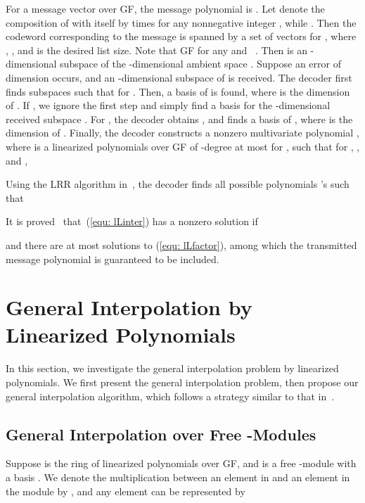 \documentclass[11pt,onecolumn,draftcls]{IEEEtran}
\begin{document}
For a message vector  over GF, the message polynomial is . Let  denote the composition of  with itself by  times for any nonnegative integer , while . Then the codeword  corresponding to the message  is spanned by a set of vectors  for , where , , and  is the desired list size. Note that  GF for any  and ~\cite{mahdavifar_it10}. Then  is an -dimensional subspace of the -dimensional ambient space . Suppose an error of dimension  occurs, and an -dimensional subspace  of  is received. The decoder first finds subspaces  such that  for . Then, a basis  of  is found, where  is the dimension of . If , we ignore the first step and simply find a basis for the -dimensional received subspace . For , the decoder obtains , and finds a basis  of , where  is the dimension of . Finally, the decoder constructs a nonzero multivariate polynomial , where  is a linearized polynomials over GF of -degree at most  for , such that for , , and ,

Using the LRR algorithm in~\cite{mahdavifar_isit10}, the decoder finds all possible polynomials 's such that

It is proved~\cite{mahdavifar_it10} that~(\ref{equ: lLinter}) has a nonzero solution if

and there are at most  solutions to (\ref{equ: lLfactor}), among which the transmitted message polynomial  is guaranteed to be included.



\section{General Interpolation by Linearized Polynomials}
\label{sec:generalinterpo}

In this section, we investigate the general interpolation problem by linearized polynomials. We first present the general interpolation problem, then propose our general interpolation algorithm, which follows a strategy similar to that in~\cite{WangMcEliece05}.


\subsection{General Interpolation over Free -Modules} \label{section: GeneralInterpolation}

Suppose  is the ring of linearized polynomials over GF, and  is a free -module with a basis .  We denote the multiplication between an element in  and an element in the module by , and any element  can be represented by
\end{document}

